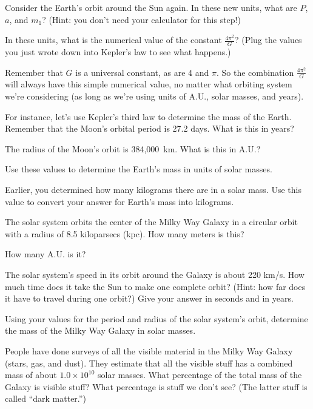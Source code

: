 Consider the Earth's orbit around the Sun again.  In these new units,
what are $P$, $a$, and $m_1$?  (Hint: you don't need your calculator for
this step!)

\answerspace{1in}

In these units, what is the numerical value of the constant $\displaystyle\frac{4\pi^2}{G}$?
(Plug the values you just wrote down into Kepler's law to see what happens.)

\answerspace{1in}

Remember that $G$ is a universal constant, as are 4 and $\pi$. 
So the combination $\displaystyle\frac{4\pi^2}{G}$ will always have this simple
numerical value, no matter what orbiting system we're considering (as
long as we're using units of A.U., solar masses, and years).

For instance, let's use Kepler's third law to determine the mass
of the Earth.  Remember that the Moon's orbital period is 27.2 days.
What is this in years?

\answerspace{1in}

The radius of the Moon's orbit is 384,000~km.  What is this in A.U.?

\answerspace{1in}

Use these values to determine the Earth's mass in units of solar masses.

\answerspace{2in}

\pagebreak[2]
Earlier, you determined how many kilograms there are in a solar mass.
Use this value to convert your answer for Earth's mass into kilograms.

\answerspace{0.9 in}

The solar system orbits the center of the Milky Way Galaxy in a circular
orbit with a radius of 8.5 kiloparsecs (kpc).  How many meters is this?

\answerspace{0.9in}

How many A.U. is it?

\answerspace{0.9 in}

The solar system's speed in its orbit around the Galaxy is about 220 km/s.
How much time does it take the Sun to make one complete orbit?  (Hint:
how far does it have to travel during one orbit?)  Give your answer in
seconds and in years.

\answerspace{1.9in}

Using your values for the period and radius of the solar system's
orbit, determine the mass of the Milky Way Galaxy in solar masses.

\answerspace{1.9in}

People have done surveys of all the visible material in the Milky
Way Galaxy (stars, gas, and dust).  They estimate that all the
visible stuff has a combined mass of about $1.0\times 10^{10}$ solar
masses.  What percentage of the total mass of the Galaxy is visible
stuff?  What percentage is stuff we don't see?  (The latter
stuff is called ``dark matter.'')


\answerspace{1in}
